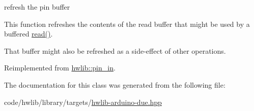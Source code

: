 refresh the pin buffer

This function refreshes the contents of the read buffer that might be used by a buffered \hyperlink{classdue_1_1pin__in_aa032c49b961b38e4afaeb4a811311449}{read()}.

That buffer might also be refreshed as a side-\/effect of other operations. 

Reimplemented from \hyperlink{classhwlib_1_1pin__in_a3fb1bfb1ec962bb6d31a5e865f0d0acb}{hwlib\+::pin\+\_\+in}.



The documentation for this class was generated from the following file\+:\begin{DoxyCompactItemize}
\item 
code/hwlib/library/targets/\hyperlink{hwlib-arduino-due_8hpp}{hwlib-\/arduino-\/due.\+hpp}\end{DoxyCompactItemize}
